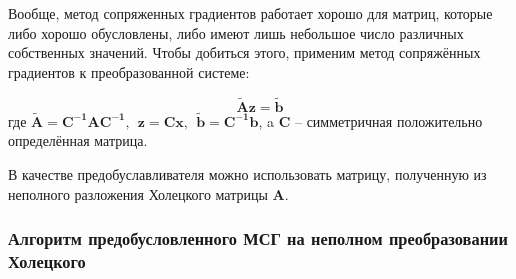 Вообще, метод сопряженных градиентов работает хорошо для матриц, которые либо хорошо обусловлены, либо имеют лишь небольшое число различных собственных значений. Чтобы добиться этого, применим метод сопряжённых градиентов к преобразованной системе:

\begin{equation}
    \mathbf{\tilde{A}z=\tilde{b}}
\end{equation}
где $\mathbf{\tilde{A} = C^{-1}AC^{-1}, ~~z = Cx,~~ \tilde{b} = C^{-1}b}$, a $\mathbf{C}$ -- симметричная положительно определённая матрица.

В качестве предобуславливателя можно использовать матрицу, полученную из неполного разложения Холецкого матрицы $\mathbf{A}$.

\subsubsection{Алгоритм предобусловленного МСГ на неполном преобразовании Холецкого}
